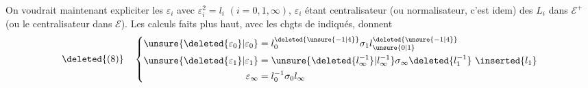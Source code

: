 On voudrait maintenant expliciter les $\varepsilon_i$ avec $\varepsilon_i^2=l_i$ $(i=0,1,\infty)$, $\varepsilon_i$ étant    centralisateur (ou normalisateur, c'est idem) des $L_i$ dans $\mathcal E^+$ (ou le centralisateur dans $\mathcal E$). Les calculs faits plus haut, avec les chgts de  indiqués, donnent
\[
\deleted{(8)}\quad\left\{\begin{aligned}
\unsure{\deleted{\varepsilon_0}|\varepsilon_0}&=l_0^{\deleted{\unsure{-1|4}}}\sigma_1 l_{\unsure{0|1}}^{\deleted{\unsure{-1|4}}}\\
\unsure{\deleted{\varepsilon_1}|\varepsilon_1}&=\unsure{\deleted{l_\infty^{-1}}|l_\infty^{-1}}\sigma_\infty \deleted{l_1^{-1}}\ \inserted{l_1}\\
\varepsilon_\infty&=l_0^{-1}\sigma_0 l_\infty
\end{aligned}\right.
\]


